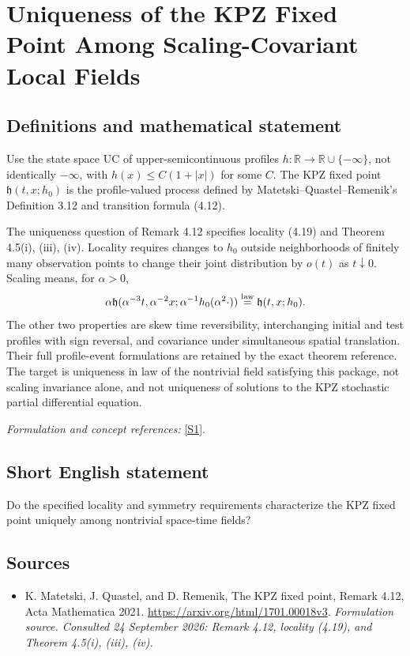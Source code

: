 \documentclass[11pt]{article}
\begin{document}
\section*{\texorpdfstring{Uniqueness of the KPZ Fixed Point Among Scaling-Covariant Local Fields}{Uniqueness of the KPZ Fixed Point Among Scaling-Covariant Local Fields}}\label{30006947}
\subsection{Definitions and mathematical statement}
Use the state space $\mathrm{UC}$ of upper-semicontinuous profiles $h:{\mathbb{R}}\to{\mathbb{R}}\cup\{-\infty\}$, not identically $-\infty$, with $h(x)\le C(1+|x|)$ for some $C$. The KPZ fixed point $\mathfrak h(t,x;h_0)$ is the profile-valued process defined by Matetski--Quastel--Remenik's Definition 3.12 and transition formula (4.12).

The uniqueness question of Remark 4.12 specifies locality (4.19) and Theorem 4.5(i), (iii), (iv). Locality requires changes to $h_0$ outside neighborhoods of finitely many observation points to change their joint distribution by $o(t)$ as $t\downarrow0$. Scaling means, for $\alpha>0$,
\[
 \alpha\mathfrak h(\alpha^{-3}t,\alpha^{-2}x;
       \alpha^{-1}h_0(\alpha^2\cdot))
 \overset{\rm law}=\mathfrak h(t,x;h_0).
\]
The other two properties are skew time reversibility, interchanging initial and test profiles with sign reversal, and covariance under simultaneous spatial translation. Their full profile-event formulations are retained by the exact theorem reference. The target is uniqueness in law of the nontrivial field satisfying this package, not scaling invariance alone, and not uniqueness of solutions to the KPZ stochastic partial differential equation.
\par\smallskip\textit{Formulation and concept references:} \href{https://arxiv.org/html/1701.00018v3}{[S1]}.

\subsection{Short English statement}
Do the specified locality and symmetry requirements characterize the KPZ fixed point uniquely among nontrivial space-time fields?
\subsection{Sources}
\begin{itemize}
\item[S1]K. Matetski, J. Quastel, and D. Remenik, The KPZ fixed point, Remark 4.12, Acta Mathematica 2021.
\url{https://arxiv.org/html/1701.00018v3}.
\textit{Formulation source. Consulted 24 September 2026: Remark 4.12, locality (4.19), and Theorem 4.5(i), (iii), (iv).}
\end{itemize}
\end{document}
